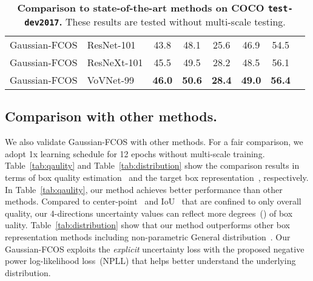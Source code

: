 \documentclass[final]{cvpr}
\begin{document}
\begin{table}[t]
{\begin{tabular}{@{}llcccccc@{}}
Gaussian-FCOS                       & ResNet-101    & 43.8                  & 48.1                 & 25.6                & 46.9                & 54.5                \\
Gaussian-FCOS                       & ResNeXt-101   & 45.5                  & 49.5                 & 28.2                & 48.5                & 56.1                \\
Gaussian-FCOS                       & VoVNet-99     & \textbf{46.0}         & \textbf{50.6}        & \textbf{28.4}       & \textbf{49.0}       & \textbf{56.4}       \\ \bottomrule
\end{tabular}
}
\caption{\textbf{Comparison to state-of-the-art methods on COCO \texttt{test-dev2017}.} These results are tested without multi-scale testing.\\
}
\label{tab:sota}
\end{table}



\subsection{Comparison with other methods.}
We also validate Gaussian-FCOS with other methods.
For a fair comparison, we adopt 1x learning schedule for 12 epochs without multi-scale training.
Table~\ref{tab:qaulity} and Table~\ref{tab:distribution} show the comparison results in terms of box quality estimation~\cite{Tian_2019_ICCV,jiang2018acquisition,wu2020iou,li2020generalized} and the target box representation~\cite{choi2019gaussian,kraus2019uncertainty,he2019bounding,li2020generalized}, respectively.
In Table~\ref{tab:qaulity}, our method achieves better performance than other methods.
Compared to center-point~\cite{Tian_2019_ICCV} and IoU~\cite{jiang2018acquisition,wu2020iou,li2020generalized} that are confined to only overall quality, our 4-directions uncertainty values can reflect more degrees~() of box uality.
Table~\ref{tab:distribution} show that our method outperforms other box representation methods including non-parametric General distribution~\cite{li2020generalized}.
Our Gaussian-FCOS exploits the \textit{explicit} uncertainty loss with the proposed negative power log-likelihood loss~(NPLL) that helps better understand the underlying distribution.
\end{document}

